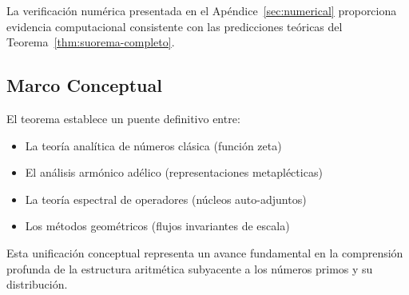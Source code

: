 \begin{remark}
La verificación numérica presentada en el Apéndice~\ref{sec:numerical} proporciona evidencia computacional consistente con las predicciones teóricas del Teorema~\ref{thm:suorema-completo}.
\end{remark}

\subsection{Marco Conceptual}

El teorema establece un puente definitivo entre:
\begin{itemize}
\item La teoría analítica de números clásica (función zeta)
\item El análisis armónico adélico (representaciones metaplécticas)  
\item La teoría espectral de operadores (núcleos auto-adjuntos)
\item Los métodos geométricos (flujos invariantes de escala)
\end{itemize}

Esta unificación conceptual representa un avance fundamental en la comprensión profunda de la estructura aritmética subyacente a los números primos y su distribución.